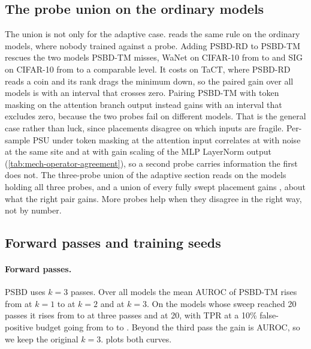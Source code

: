
\FloatBarrier


\subsection{The probe union on the ordinary models}
\label{app:union}

The union is not only for the adaptive case.  reads the same rule on the \ProbeUnionNModels{} ordinary models, where nobody trained against a probe. Adding PSBD-RD to PSBD-TM rescues the two models PSBD-TM misses, WaNet on CIFAR-10 from \ProbeUnionWanetCifarOneZeroTm{} to \ProbeUnionWanetCifarOneZeroTmRd{} and SIG on CIFAR-10 from \HeadlineFloorAuroc{} to a comparable level. It costs on TaCT, where PSBD-RD reads a coin and its rank drags the minimum down, so the paired gain over all models is \ProbeUnionTmRdGain{} with an interval \ProbeUnionTmRdGainCi{} that crosses zero. Pairing PSBD-TM with token masking on the attention branch output instead gains \ProbeUnionTmBranchGain{} with an interval that excludes zero, because the two probes fail on different models. That is the general case rather than luck, since placements disagree on which inputs are fragile. Per-sample PSU under token masking at the attention input correlates at \AgreementGaussianVsTokenMaskClean{} with noise at the same site and at \AgreementGainScaleVsRecommendedClean{} with gain scaling of the MLP LayerNorm output (\cref{tab:mech-operator-agreement}), so a second probe carries information the first does not. The three-probe union of the adaptive section reads \ProbeUnionThreeProbeAuroc{} on the \ProbeUnionThreeProbeN{} models holding all three probes, and a union of every fully swept placement gains \ProbeUnionAllBasisGain{}, about what the right pair gains. More probes help when they disagree in the right way, not by number.



\subsection{Forward passes and training seeds}
\label{app:cost}

\paragraph{Forward passes.}
\label{sec:robustness:passes}

PSBD uses $k = 3$ passes. Over all \PassAllCells{} models the mean AUROC of PSBD-TM rises from \PassAllAurocKOne{} at $k = 1$ to \PassAllAurocKTwo{} at $k = 2$ and \PassAllAurocKThree{} at $k = 3$. On the \PassPilotCells{} models whose sweep reached 20 passes it rises from \PassPilotAurocKOne{} to \PassPilotAurocKThree{} at three passes and \PassPilotAurocKTwoZero{} at 20, with TPR at a 10\% false-positive budget going from \PassPilotTprOneZeroKOne{} to \PassPilotTprOneZeroKThree{} to \PassPilotTprOneZeroKTwoZero{}. Beyond the third pass the gain is \PassPilotAurocGainBeyondThree{} AUROC, so we keep the original $k = 3$.  plots both curves.


